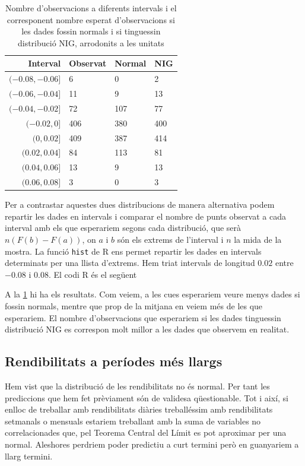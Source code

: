 \documentclass{article}
\numberwithin{table}{section}
\numberwithin{figure}{section}
\numberwithin{equation}{section}
\begin{document}
\begin{table}[htb]
	\centering \sffamily \small
	\caption{Nombre d'observacions a diferents intervals i el corresponent nombre esperat d'observacions si les dades fossin normals i si tinguessin distribució NIG, arrodonits a les unitats}
	\label{tab:intervals}
	\begin{tabular}{@{}rlll@{}}
		\toprule 
		Interval & Observat & Normal & NIG \\
		\midrule
 		\( (-0.08,-0.06] \) & 6 &   0 &   2 \\
 		\( (-0.06,-0.04] \) & 11 &   9 &  13 \\
 		\( (-0.04,-0.02] \) & 72 & 107 &  77 \\
		\( (-0.02, 0] \) & 406 & 380 & 400 \\
		\( (0, 0.02] \) & 409 & 387 & 414 \\
 		\( (0.02, 0.04] \) & 84 & 113 &  81 \\
 		\( (0.04, 0.06] \) & 13 &   9 &  13 \\
  	\( (0.06, 0.08] \) & 3 &   0 &   3 \\
		\bottomrule 
	\end{tabular}
\end{table}

Per a contrastar aquestes dues distribucions de manera alternativa podem repartir les dades en intervals i comparar el nombre de punts observat a cada interval amb els que esperariem segons cada distribució, que serà \( n (F(b) - F(a)) \), on \( a \) i \( b \) són els extrems de l'interval i \( n \) la mida de la mostra. La funció \texttt{hist} de \textsf{R} ens permet repartir les dades en intervals determinats per una llista d'extrems. Hem triat intervals de longitud \( 0.02 \) entre \( -0.08 \) i \( 0.08 \). El codi \textsf{R} és el següent

A la \cref{tab:intervals} hi ha els resultats. Com veiem, a les cues esperariem veure menys dades si fossin normals, mentre que prop de la mitjana en veiem més de les que esperariem. El nombre d'observacions que esperariem si les dades tinguessin distribució NIG es correspon molt millor a les dades que observem en realitat.

\subsection{Rendibilitats a períodes més llargs}
Hem vist que la distribució de les rendibilitats no és normal. Per tant les prediccions que hem fet prèviament són de validesa qüestionable. Tot i així, si enlloc de treballar amb rendibilitats diàries treballéssim amb rendibilitats setmanals o mensuals estariem treballant amb la suma de variables no correlacionades que, pel Teorema Central del Límit es pot aproximar per una normal. Aleshores perdriem poder predictiu a curt termini però en guanyariem a llarg termini.
\end{document}
